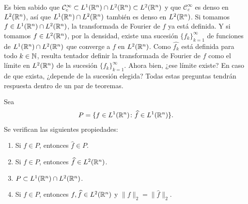 \documentclass[a4paper, 11pt, oneside]{report}
\begin{document}
Es bien sabido que $\mathcal{C}^\infty_c \subset L^1(\mathbb R^n) \cap L^2(\mathbb R^n) \subset L^2(\mathbb R^n)$ y que $\mathcal{C}^\infty_c$ es denso en $L^2(\mathbb R^n)$, así que $L^1(\mathbb R^n) \cap L^2(\mathbb R^n)$ también es denso en $L^2(\mathbb R^n)$. Si tomamos $f \in L^1(\mathbb R^n) \cap L^2(\mathbb R^n)$, la transformada de Fourier de $f$ ya está definida. Y si tomamos $f \in L^2(\mathbb R^n)$, por la densidad, existe una sucesión $\{f_k\}_{k=1}^\infty$ de funciones de $L^1(\mathbb R^n) \cap L^2(\mathbb R^n)$ que converge a $f$ en $L^2(\mathbb R^n)$. Como $\widehat{f_k}$ está definida para todo $k \in \mathbb N$, resulta tentador definir la transformada de Fourier de $f$ como el límite en $L^2(\mathbb R^n)$ de la sucesión $\{\widehat{f_k}\}_{k=1}^\infty$. Ahora bien, ¿ese límite existe? En caso de que exista, ¿depende de la sucesión elegida? Todas estas preguntas tendrán respuesta dentro de un par de teoremas.

\begin{proposition}
  Sea
  \[P = \{f \in L^1(\mathbb R^n) \colon \widehat{f} \in L^1(\mathbb R^n)\}.\]
  Se verifican las siguientes propiedades:
  \begin{enumerate}
    \item Si $f \in P$, entonces $\widehat{f} \in P$.
    \item Si $f \in P$, entonces $\widehat{f} \in L^2(\mathbb R^n)$.
    \item $P \subset L^1(\mathbb R^n) \cap L^2(\mathbb R^n)$.
    \item Si $f \in P$, entonces $f,\widehat{f} \in L^2(\mathbb R^n)$ y $\|f\|_2 = \|\widehat{f}\|_2$.
  \end{enumerate}
\end{proposition}
\end{document}

